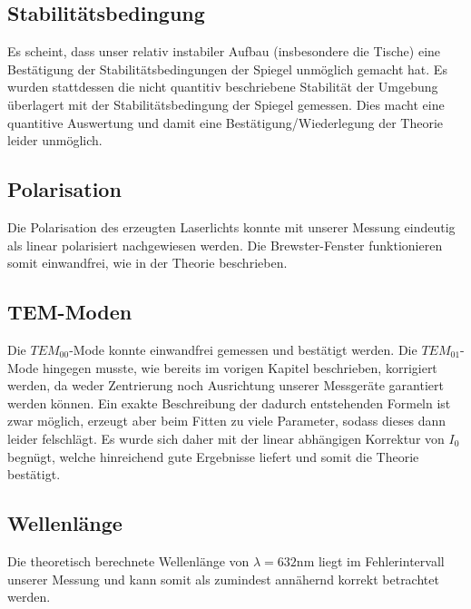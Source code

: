 \subsection{Stabilitätsbedingung}
Es scheint, dass unser relativ instabiler Aufbau (insbesondere die Tische) eine Bestätigung der Stabilitätsbedingungen der Spiegel unmöglich gemacht hat.
Es wurden stattdessen die nicht quantitiv beschriebene Stabilität der Umgebung überlagert mit der Stabilitätsbedingung der Spiegel gemessen.
Dies macht eine quantitive Auswertung und damit eine Bestätigung/Wiederlegung der Theorie leider unmöglich.

\subsection{Polarisation}
Die Polarisation des erzeugten Laserlichts konnte mit unserer Messung eindeutig als linear polarisiert nachgewiesen werden.
Die Brewster-Fenster funktionieren somit einwandfrei, wie in der Theorie beschrieben.

\subsection{TEM-Moden}
Die $TEM_{00}$-Mode konnte einwandfrei gemessen und bestätigt werden.
Die $TEM_{01}$-Mode hingegen musste, wie bereits im vorigen Kapitel beschrieben, korrigiert werden, da weder Zentrierung noch Ausrichtung unserer Messgeräte garantiert werden können.
Ein exakte Beschreibung der dadurch entstehenden Formeln ist zwar möglich, erzeugt aber beim Fitten zu viele Parameter, sodass dieses dann leider felschlägt.
Es wurde sich daher mit der linear abhängigen Korrektur von $I_0$ begnügt, welche hinreichend gute Ergebnisse liefert und somit die Theorie bestätigt.

\subsection{Wellenlänge}
Die theoretisch berechnete Wellenlänge von $\lambda=632\si{\nano\meter} $ liegt im Fehlerintervall unserer Messung und kann somit als zumindest annähernd korrekt betrachtet werden.
